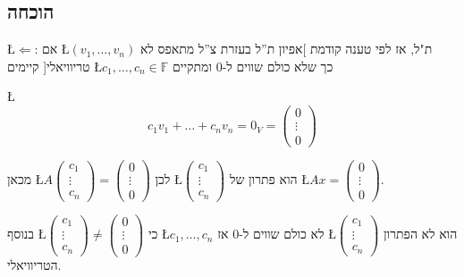 \documentclass[english,hebrew]{article}
\begin{document}
\subsection{הוכחה}

\L{$\Leftarrow$}: אם \L{$(v_{1},\dots,v_{n})$} ת"ל, אז לפי טענה
קודמת {]}אפיון ת\textquotedblright ל בעזרת צ\textquotedblright ל מתאפס
לא טריוויאלי{[} קיימים \L{$c_{1},\dots,c_{n}\in\mathbb{F}$} כך שלא
כולם שווים ל-0 ומתקיים

\L{%
\[
c_{1}v_{1}+\dots+c_{n}v_{n}=0_{V}=\begin{pmatrix}0\\
\vdots\\
0
\end{pmatrix}
\]
}%

מכאן \L{$A\begin{pmatrix}c_{1}\\
\vdots\\
c_{n}
\end{pmatrix}=\begin{pmatrix}0\\
\vdots\\
0
\end{pmatrix}$} לכן \L{$\begin{pmatrix}c_{1}\\
\vdots\\
c_{n}
\end{pmatrix}$} הוא פתרון של \L{$Ax=\begin{pmatrix}0\\
\vdots\\
0
\end{pmatrix}$}.

בנוסף \L{$\begin{pmatrix}c_{1}\\
\vdots\\
c_{n}
\end{pmatrix}\neq\begin{pmatrix}0\\
\vdots\\
0
\end{pmatrix}$} כי \L{$c_{1},\dots,c_{n}$} לא כולם שווים ל-0 אז \L{$\begin{pmatrix}c_{1}\\
\vdots\\
c_{n}
\end{pmatrix}$} הוא לא הפתרון הטריוויאלי.\\
\end{document}
